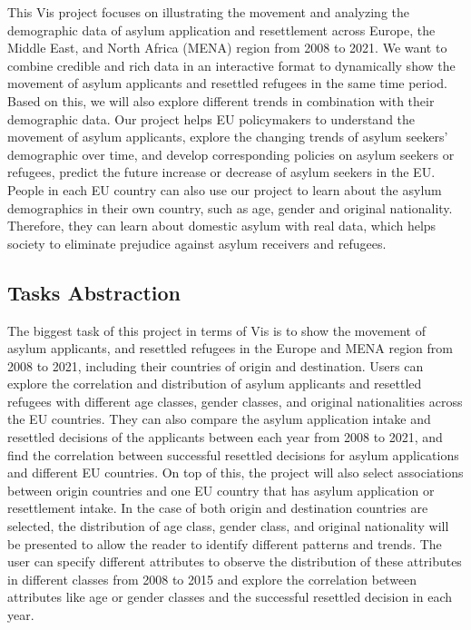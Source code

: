 \documentclass[journal]{vgtc}                %
\begin{document}
This Vis project focuses on illustrating the movement and analyzing the demographic data of asylum application and resettlement across Europe, the Middle East, and North Africa (MENA) region from 2008 to 2021. We want to combine credible and rich data in an interactive format to dynamically show the movement of  asylum applicants and resettled refugees in the same time period. Based on this, we will also explore different trends in combination with their demographic data. Our project helps EU policymakers to understand the movement of asylum applicants, explore the changing trends of asylum seekers’ demographic over time, and develop corresponding policies on asylum seekers or refugees, predict the future increase or decrease of asylum seekers in the EU. People in each EU country can also use our project to learn about the asylum demographics in their own country, such as age, gender and original nationality. Therefore, they can learn about domestic asylum with real data, which helps society to eliminate prejudice against asylum receivers and refugees. 

\subsection{Tasks Abstraction}

The biggest task of this project in terms of Vis is to show the movement of asylum applicants,  and resettled refugees in the Europe and MENA region from 2008 to 2021, including their countries of origin and destination. Users can explore the correlation and distribution of asylum applicants and resettled refugees with different age classes, gender classes, and original nationalities across the EU countries. They can also compare the asylum application intake and resettled decisions of the applicants between each year from 2008 to 2021, and find the correlation between successful resettled decisions for asylum applications and different EU countries. On top of this, the project will also select associations between origin countries and  one EU country that has asylum application or resettlement intake. In the case of both origin and destination countries are selected, the distribution of age class, gender class, and original nationality will be presented to allow the reader to identify different patterns and trends. The user can specify different attributes to observe the distribution of these attributes in different classes from 2008 to 2015 and explore the correlation between attributes like age or gender classes and the successful resettled decision in each year.
\end{document}
